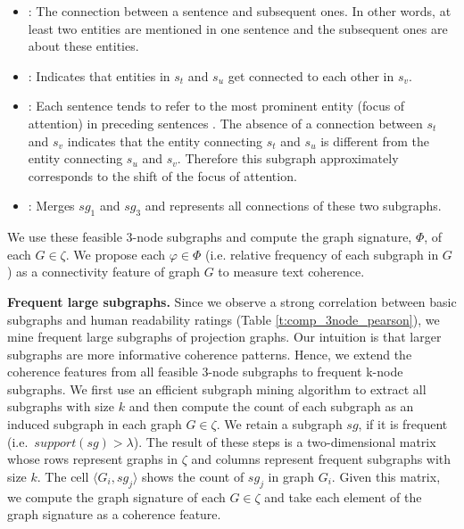 \begin{itemize}
\item {}: The connection between a sentence and subsequent ones. In other words, at least two entities are mentioned in one sentence and the subsequent ones are about these entities.

\item {}: Indicates that entities in $s_t$ and $s_u$ get connected to each other in $s_v$.

\item {}: Each sentence tends to refer to the most prominent entity (focus of attention) in preceding sentences \cite{sidner83,grosz95}. 
The absence of a connection between $s_t$ and $s_v$ indicates that the entity connecting $s_t$ and $s_u$ is different from the entity connecting $s_u$ and $s_v$. 
Therefore this subgraph approximately corresponds to the shift of the focus of attention.

\item {}: Merges $sg_1$ and $sg_3$ and represents all connections of these two subgraphs.
\end{itemize}

We use these feasible 3-node subgraphs and compute the graph signature, $\Phi$, of each $G\in\zeta$. 
We propose each $\varphi\in\Phi$ (i.e. relative frequency of each subgraph in $G$) as a connectivity feature of graph $G$ to measure text coherence. 

%

\textbf{Frequent large subgraphs.} Since we observe a strong correlation between basic subgraphs and human readability ratings
(Table \ref{t:comp_3node_pearson}), we mine frequent large subgraphs of projection graphs. 
Our intuition is that larger subgraphs are more informative coherence patterns. 
Hence, we extend the coherence features from all feasible 3-node subgraphs to frequent k-node subgraphs. 
We first use an efficient subgraph mining algorithm to extract all subgraphs with size $k$ and then compute the count of each subgraph as an induced subgraph in each graph $G\in\zeta$. 
We retain a subgraph $sg$, if it is frequent (i.e.\ $support(sg)>\lambda$). 
The result of these steps is a two-dimensional matrix whose rows represent graphs in $\zeta$ and columns represent frequent subgraphs with size $k$. 
The cell $\langle G_i,sg_j\rangle$ shows the count of $sg_j$ in graph $G_i$. Given this matrix, we compute the graph signature of each $G\in\zeta$ and take
each element of the graph signature as a coherence feature.




